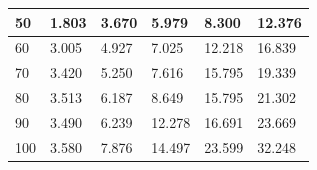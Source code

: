 \begin{table}[htp]
\begin{tabular}{|l|l|l|l|l|l|}
50                               & 1.803           & 3.670            & 5.979            & 8.300            & 12.376           \\ \hline
60                               & 3.005           & 4.927            & 7.025            & 12.218           & 16.839           \\ \hline
70                               & 3.420           & 5.250            & 7.616            & 15.795           & 19.339           \\ \hline
80                               & 3.513           & 6.187            & 8.649            & 15.795           & 21.302           \\ \hline
90                               & 3.490           & 6.239            & 12.278           & 16.691           & 23.669           \\ \hline
100                              & 3.580           & 7.876            & 14.497           & 23.599           & 32.248           \\ \hline
\end{tabular}
\end{table}

